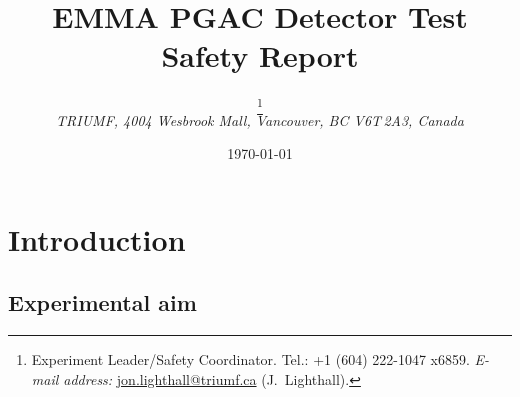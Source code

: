 \title{EMMA PGAC Detector Test\\ Safety Report}
\author{\authname\footnote{Experiment Leader/Safety Coordinator.  Tel.: +1 (604) 222-1047 x6859. \newline  \textit{\hspace*{1.5em} E-mail address:} \href{mailto:jon.lighthall@triumf.ca}{jon.lighthall@triumf.ca} (J.\ Lighthall).} \\ \small \itshape TRIUMF, 4004 Wesbrook Mall, Vancouver, BC V6T\,2A3, Canada}
\date{\small \longusdate \today}%
\maketitle
\pagestyle{fancy}
\lhead{}
\renewcommand{\headrulewidth}{0pt}
\section{Introduction}
\subsection{Experimental aim}


